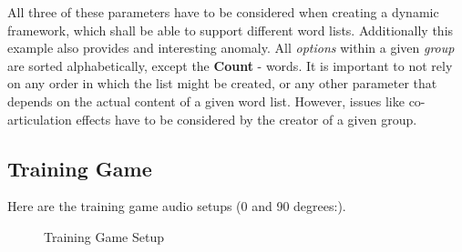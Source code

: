 \documentclass[a4paper,11pt]{article}%
\renewcommand{\\}{\vspace*{0.5\baselineskip} \newline}
\begin{document}
All three of these parameters have to be considered when creating a dynamic framework, which shall be able to support different word lists. Additionally this example also provides and interesting anomaly. All \textit{options} within a given \textit{group} are sorted alphabetically, except the \textbf{Count} - words. It is important to not rely on any order in which the list might be created, or any other parameter that depends on the actual content of a given word list.
\newline
\newline
However, issues like co-articulation effects have to be considered by the creator of a given group.

\subsection{Training Game}
Here are the training game audio setups (0 and 90 degrees:).
\begin{figure}[h!]
	\hspace{0.1\textwidth}
\caption{Training Game Setup}
\vspace{3mm}
\end{figure}
\newline
\newline
\end{document}
